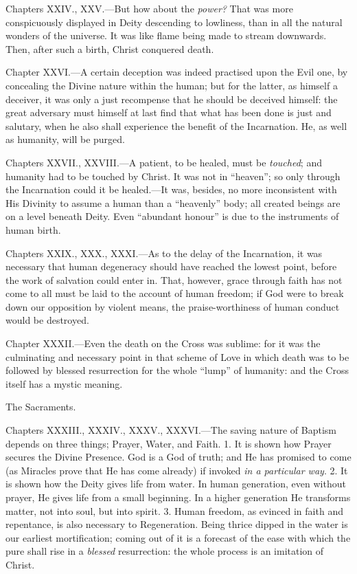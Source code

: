 Chapters XXIV., XXV.—But how about the \emph{power?} That was more conspicuously displayed in Deity descending to lowliness, than in all the natural wonders of the universe. It was like flame being made to stream downwards. Then, after such a birth, Christ conquered death.

Chapter XXVI.—A certain deception was indeed practised upon the Evil one, by concealing the Divine nature within the human; but for the latter, as himself a deceiver, it was only a just recompense that he should be deceived himself: the great adversary must himself at last find that what has been done is just and salutary, when he also shall experience the benefit of the Incarnation. He, as well as humanity, will be purged.

Chapters XXVII., XXVIII.—A patient, to be healed, must be \emph{touched}; and humanity had to be touched by Christ. It was not in “heaven”; so only through the Incarnation could it be healed.—It was, besides, no more inconsistent with His Divinity to assume a human than a “heavenly” body; all created beings are on a level beneath Deity. Even “abundant honour” is due to the instruments of human birth.

Chapters XXIX., XXX., XXXI.—As to the delay of the Incarnation, it was necessary that human degeneracy should have reached the lowest point, before the work of salvation could enter in. That, however, grace through faith has not come to all must be laid to the account of human freedom; if God were to break down our opposition by violent means, the praise-worthiness of human conduct would be destroyed.

Chapter XXXII.—Even the death on the Cross was sublime: for it was the culminating and necessary point in that scheme of Love in which death was to be followed by blessed resurrection for the whole “lump” of humanity: and the Cross itself has a mystic meaning.

The Sacraments.

Chapters XXXIII., XXXIV., XXXV., XXXVI.—The saving nature of Baptism depends on three things; Prayer, Water, and Faith. 1. It is shown how Prayer secures the Divine Presence. God is a God of truth; and He has promised to come (as Miracles prove that He has come already) if invoked \emph{in a particular way}. 2. It is shown how the Deity gives life from water. In human generation, even without prayer, He gives life from a small beginning. In a higher generation He transforms matter, not into soul, but into spirit. 3. Human freedom, as evinced in faith and repentance, is also necessary to Regeneration. Being thrice dipped in the water is our earliest mortification; coming out of it is a forecast of the ease with which the pure shall rise in a \emph{blessed} resurrection: the whole process is an imitation of Christ.

